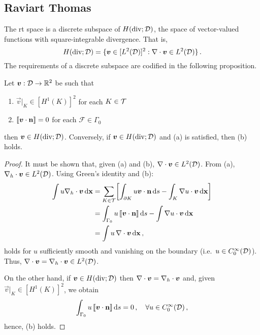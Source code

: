 \documentclass[../doc.tex]{subfiles}
\begin{document}
\subsection{Raviart Thomas} \label{fem_sec:fes_rt}
The \gls{rt} space \cite{Raviart1977,raviart_thomas} is a discrete subspace of $H(\operatorname{div};\mathcal{D})$, the space of vector-valued functions with square-integrable divergence. That is, 
	\begin{equation}
		H(\operatorname{div};\mathcal{D}) = \{ \boldsymbol{v} \in [L^2(\mathcal{D})]^2 : \nabla\cdot\boldsymbol{v} \in L^2(\mathcal{D}) \} \,. 
	\end{equation}
The requirements of a discrete subspace are codified in the following proposition. 
\begin{prop} \label{fem:div_prop}
Let $\boldsymbol{v} : \mathcal{D} \rightarrow \mathbb{R}^2$ be such that 
\begin{enumerate}
	\item $\vec{v}|_K \in [H^1(K)]^2$ for each $K \in \mathcal{T}$  
	\item $\left\llbracket\boldsymbol{v}\cdot\boldsymbol{\mathrm{n}} \right\rrbracket = 0$ for each $\mathcal{F} \in \Gamma_0$ 
\end{enumerate}
then $\boldsymbol{v} \in H(\operatorname{div};\mathcal{D})$. Conversely, if $\boldsymbol{v} \in H(\operatorname{div};\mathcal{D})$ and (a) is satisfied, then (b) holds. 
\end{prop}
\begin{proof}
It must be shown that, given (a) and (b), $\nabla\cdot\boldsymbol{v} \in L^2(\mathcal{D})$. From (a), $\nabla_h\cdot\boldsymbol{v} \in L^2(\mathcal{D})$. Using Green's identity and (b): 
	\begin{equation}
	\begin{aligned}
		\int u\nabla_h\cdot\boldsymbol{v} \mathop{}\!\mathrm{d} \boldsymbol{\mathrm{x}} &= \sum_{K\in\mathcal{T}} \!\left[ \int_{\partial K} u \boldsymbol{v}\cdot\boldsymbol{\mathrm{n}} \mathop{}\!\mathrm{d} s - \int_K \nabla u \cdot \boldsymbol{v} \mathop{}\!\mathrm{d} \boldsymbol{\mathrm{x}}  \right] \\
		&= \int_{\Gamma_0} u \left\llbracket\boldsymbol{v}\cdot\boldsymbol{\mathrm{n}} \right\rrbracket \mathop{}\!\mathrm{d} s - \int \nabla u \cdot \boldsymbol{v} \mathop{}\!\mathrm{d} \boldsymbol{\mathrm{x}} \\
		&= \int u\, \nabla\cdot\boldsymbol{v} \mathop{}\!\mathrm{d} \boldsymbol{\mathrm{x}} \,, 
	\end{aligned}
	\end{equation}
holds for $u$ sufficiently smooth and vanishing on the boundary (i.e.~$u \in C_0^\infty(\mathcal{D})$). Thus, $\nabla\cdot\boldsymbol{v} = \nabla_h\cdot\boldsymbol{v} \in L^2(\mathcal{D})$. 

On the other hand, if $\boldsymbol{v} \in H(\operatorname{div};\mathcal{D})$ then $\nabla\cdot\boldsymbol{v} = \nabla_h\cdot\boldsymbol{v}$ and, given $\vec{v}|_K \in [H^1(K)]^2$, we obtain 
	\begin{equation}
		\int_{\Gamma_0} u \left\llbracket\boldsymbol{v}\cdot\boldsymbol{\mathrm{n}} \right\rrbracket \mathop{}\!\mathrm{d} s = 0 \,, \quad \forall u \in C_0^\infty(\mathcal{D}) \,, 
	\end{equation}
hence, (b) holds.
\end{proof}
\end{document}
